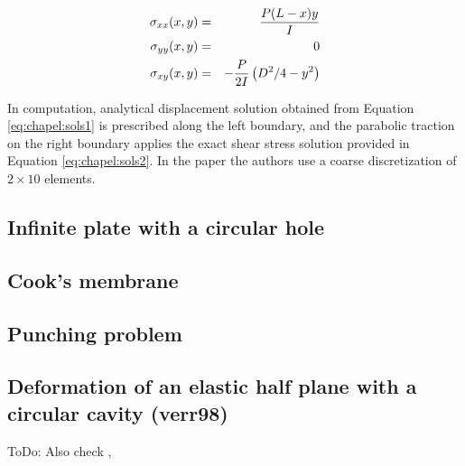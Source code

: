 \begin{eqnarray}
\sigma_{xx}(x,y)&=&\frac{P(L-x)y}{I} \nonumber\\
\sigma_{yy}(x,y)&=&0 \nonumber\\
\sigma_{xy}(x,y)&=&-\frac{P}{2I}\left( D^2/4 - y^2 \right) \label{eq:chapel:sols2}
\end{eqnarray}

In computation, analytical displacement solution obtained from Equation \eqref{eq:chapel:sols1}
is prescribed along the left boundary, and the parabolic traction 
on the right boundary applies the exact shear stress
solution provided in Equation \eqref{eq:chapel:sols2}. 
In the paper the authors use a coarse discretization of $2\times 10$ elements.

\subsection{Infinite plate with a circular hole}

\subsection{Cook’s membrane}

\subsection{Punching problem}


\subsection{Deformation of an elastic half plane with a circular cavity (verr98)}


ToDo: Also check \cite{verr97}, \cite{vebo98}







